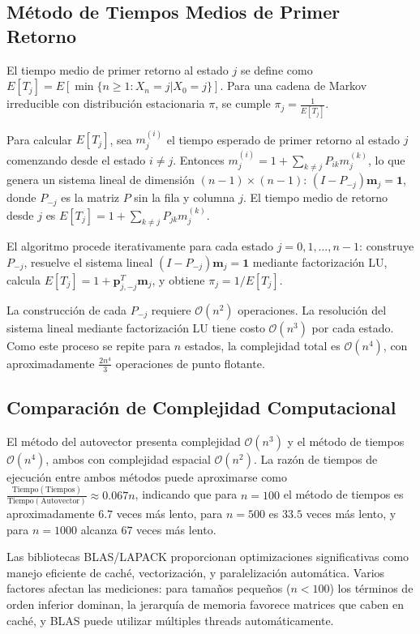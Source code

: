 \subsection{Método de Tiempos Medios de Primer Retorno}

El tiempo medio de primer retorno al estado $j$ se define como $E[T_j] = E[\min\{n \geq 1 : X_n = j | X_0 = j\}]$. Para una cadena de Markov irreducible con distribución estacionaria $\pi$, se cumple $\pi_j = \frac{1}{E[T_j]}$.

Para calcular $E[T_j]$, sea $m_j^{(i)}$ el tiempo esperado de primer retorno al estado $j$ comenzando desde el estado $i \neq j$. Entonces $m_j^{(i)} = 1 + \sum_{k \neq j} P_{ik} m_j^{(k)}$, lo que genera un sistema lineal de dimensión $(n-1) \times (n-1)$: $(I - P_{-j}) \mathbf{m}_j = \mathbf{1}$, donde $P_{-j}$ es la matriz $P$ sin la fila y columna $j$. El tiempo medio de retorno desde $j$ es $E[T_j] = 1 + \sum_{k \neq j} P_{jk} m_j^{(k)}$.

El algoritmo procede iterativamente para cada estado $j = 0, 1, \ldots, n-1$: construye $P_{-j}$, resuelve el sistema lineal $(I - P_{-j}) \mathbf{m}_j = \mathbf{1}$ mediante factorización LU, calcula $E[T_j] = 1 + \mathbf{p}_{j,-j}^T \mathbf{m}_j$, y obtiene $\pi_j = 1/E[T_j]$.

La construcción de cada $P_{-j}$ requiere $\mathcal{O}(n^2)$ operaciones. La resolución del sistema lineal mediante factorización LU tiene costo $\mathcal{O}(n^3)$ por cada estado. Como este proceso se repite para $n$ estados, la complejidad total es $\mathcal{O}(n^4)$, con aproximadamente $\frac{2n^4}{3}$ operaciones de punto flotante.

\subsection{Comparación de Complejidad Computacional}

El método del autovector presenta complejidad $\mathcal{O}(n^3)$ y el método de tiempos $\mathcal{O}(n^4)$, ambos con complejidad espacial $\mathcal{O}(n^2)$. La razón de tiempos de ejecución entre ambos métodos puede aproximarse como $\frac{\text{Tiempo}(\text{Tiempos})}{\text{Tiempo}(\text{Autovector})} \approx 0.067n$, indicando que para $n = 100$ el método de tiempos es aproximadamente $6.7$ veces más lento, para $n = 500$ es $33.5$ veces más lento, y para $n = 1000$ alcanza $67$ veces más lento.

Las bibliotecas BLAS/LAPACK proporcionan optimizaciones significativas como manejo eficiente de caché, vectorización, y paralelización automática. Varios factores afectan las mediciones: para tamaños pequeños ($n < 100$) los términos de orden inferior dominan, la jerarquía de memoria favorece matrices que caben en caché, y BLAS puede utilizar múltiples threads automáticamente.


